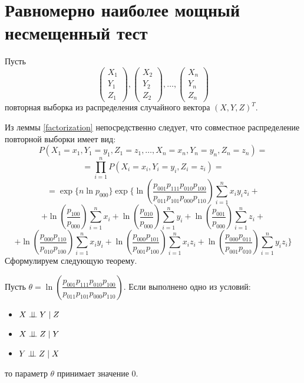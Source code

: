 \section{Равномерно наиболее мощный несмещенный тест}
Пусть
$$
    \begin{pmatrix}
        X_1 \\
        Y_1 \\
        Z_1
    \end{pmatrix},
    \begin{pmatrix}
        X_2 \\
        Y_2 \\
        Z_2
    \end{pmatrix}, \ldots,
    \begin{pmatrix}
        X_n \\
        Y_n \\
        Z_n
    \end{pmatrix}
$$ повторная выборка из распределения случайного вектора $(X,Y,Z)^T$.

Из леммы \ref{factorization} непосредственно следует, что совместное распределение повторной выборки имеет вид:
$$
P(X_1=x_1,Y_1=y_1,Z_1=z_1,\ldots,X_n=x_n,Y_n=y_n,Z_n=z_n)=
$$
$$
=\prod_{i=1}^n P(X_i=x_i,Y_i=y_i,Z_i=z_i) = 
$$
$$=\exp \Biggl\{ n \ln p_{000}\Biggr\}
        \exp \Biggl\{ \ln  \left(\dfrac{p_{001}p_{111}p_{010}p_{100}}{p_{011}p_{101}p_{000}p_{110}}\right) \sum_{i=1}^n x_i y_i z_i +$$
    $$ +
        \ln\left(\dfrac{p_{100}}{p_{000}}\right) \sum_{i=1}^{n} x_i + \ln\left(\dfrac{p_{010}}{p_{000}}\right) \sum_{i=1}^{n} y_i +
        \ln\left(\dfrac{p_{001}}{p_{000}}\right) \sum_{i=1}^{n} z_i +
    $$
    $$
        +\ln \left(\dfrac{p_{000}p_{110}}{p_{010}p_{100}}\right) \sum_{i=1}^n x_i y_i +
        \ln \left(\dfrac{p_{000}p_{101}}{p_{001}p_{100}}\right) \sum_{i=1}^n x_i z_i +
        \ln \left(\dfrac{p_{000}p_{011}}{p_{001}p_{010}}\right) \sum_{i=1}^n y_i z_i \Biggr\}
    $$
Сформулируем следующую теорему.

\begin{theorem}
Пусть $\theta = \ln  \left(\dfrac{p_{001}p_{111}p_{010}p_{100}}{p_{011}p_{101}p_{000}p_{110}}\right)$.
Если выполнено одно из условий:
\begin{itemize}
    \item $X \perp\!\!\!\perp Y \mid Z$
    \item $X \perp\!\!\!\perp Z \mid Y$
    \item $Y \perp\!\!\!\perp Z \mid X$
\end{itemize}
то параметр $\theta$ принимает значение $0$.
\end{theorem}

